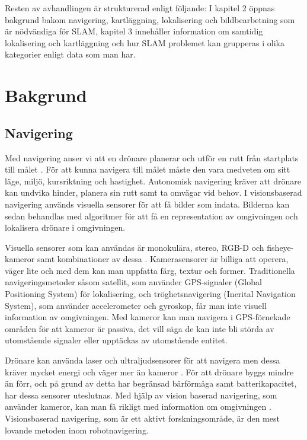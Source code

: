 Resten av avhandlingen är strukturerad enligt följande: I kapitel 2 öppnas bakgrund bakom navigering, kartläggning, lokalisering och bildbearbetning som är nödvändiga för SLAM, kapitel 3 innehåller information om samtidig lokalisering och kartläggning och hur SLAM problemet kan grupperas i olika kategorier enligt data som man har.

\chapter{Bakgrund}

\section{Navigering}

Med navigering anser vi att en drönare planerar och utför en rutt från startplats till målet \citep{geospatial}. För att kunna navigera till målet måste den vara medveten om sitt läge, miljö, kursriktning och hastighet. Autonomisk navigering kräver att drönare kan undvika hinder, planera sin rutt samt ta omvägar vid behov. I visionsbaserad navigering används visuella sensorer för att få bilder som indata. Bilderna kan sedan behandlas med algoritmer för att få en representation av omgivningen och lokalisera drönare i omgivningen. 

Visuella sensorer som kan användas är monokulära, stereo, RGB-D och fisheye-kameror samt kombinationer av dessa \citep{geospatial}. Kamerasensorer är billiga att operera, väger lite och med dem kan man uppfatta färg, textur och former. Traditionella navigeringsmetoder såsom satellit, som använder GPS-signaler (Global Positioning System) för lokalisering, och tröghetsnavigering (Inerital Navigation System), som använder accelerometer och gyroskop, får man inte visuell information av omgivningen. Med kameror kan man navigera i GPS-förnekade områden för att kameror är passiva, det vill säga de kan inte bli störda av utomstående signaler eller upptäckas av utomstående entitet. 

Drönare kan använda laser och ultraljudsensorer för att navigera men dessa kräver mycket energi och väger mer än kameror \citep{6385934}. För att drönare byggs mindre än förr, och på grund av detta har begränsad bärförmåga samt batterikapacitet, har dessa sensorer uteslutnas. Med hjälp av vision baserad navigering, som använder kameror, kan man få rikligt med information om omgivningen \citep{geospatial}. Visionsbaserad navigering, som är ett aktivt forskningsområde, är den mest lovande metoden inom robotnavigering.

